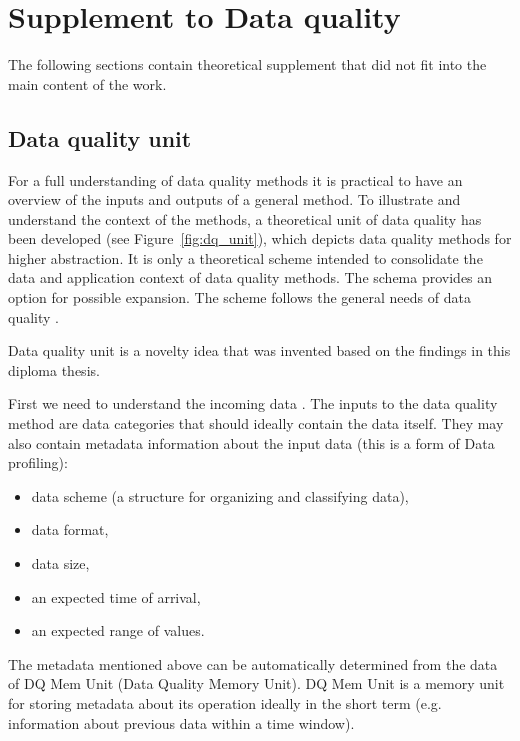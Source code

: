 \chapter{Supplement to Data quality}
	
		The following sections contain theoretical supplement that did not fit into the main content of the work.
		
	\section{Data quality unit}
	\label{sec:data_quality_unit}  
	
				For a full understanding of data quality methods it is practical to have an overview of the inputs and outputs of a general method. To illustrate and understand the context of the methods, a theoretical unit of data quality has been developed (see Figure~\ref{fig:dq_unit}), which depicts data quality methods for higher abstraction. It is only a theoretical scheme intended to consolidate the data and application context of data quality methods. The schema provides an option for possible expansion. The scheme follows the general needs of data quality .
				
				Data quality unit is a novelty idea that was invented based on the findings in this diploma thesis.
	
		
				First we need to understand the incoming data . The inputs to the data quality method are data categories  that should ideally contain the data itself. They may also contain metadata information about the input data (this is a form of Data profiling):
		
				\begin{itemize}
					\item data scheme (a structure for organizing and classifying data),
					\item data format,
					\item data size,
					\item an expected time of arrival,
					\item an expected range of values.
				\end{itemize}
			
				The metadata mentioned above can be automatically determined from the data of DQ Mem Unit (Data Quality Memory Unit). DQ Mem Unit is a memory unit for storing metadata about its operation ideally in the short term (e.g. information about previous data within a time window).
			
